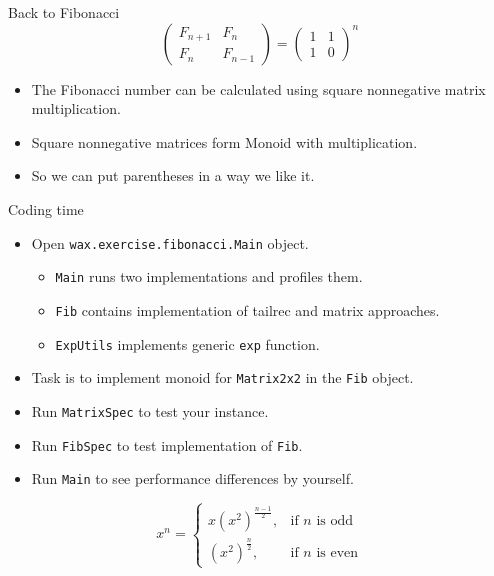 \documentclass[presentation,aspectratio=169,smaller]{beamer}
\begin{document}
\begin{frame}[label={sec:org6fd0c10}]{Back to Fibonacci}
\begin{equation*}
  \begin{pmatrix}
    F_{n+1} & F_n \\
    F_n & F_{n-1}
  \end{pmatrix} =
  \begin{pmatrix}
    1 & 1 \\
    1 & 0
  \end{pmatrix} ^ n
\end{equation*}

\pause

\begin{itemize}
\item The Fibonacci number can be calculated using square nonnegative matrix
multiplication.
\item Square nonnegative matrices form Monoid with multiplication.
\item So we can put parentheses in a way we like it.
\end{itemize}
\end{frame}

\begin{frame}[label={sec:org7776502},fragile]{Coding time}
 \begin{itemize}
\item Open \texttt{wax.exercise.fibonacci.Main} object.
\begin{itemize}
\item \texttt{Main} runs two implementations and profiles them.
\item \texttt{Fib} contains implementation of tailrec and matrix approaches.
\item \texttt{ExpUtils} implements generic \texttt{exp} function.
\end{itemize}
\item Task is to implement monoid for \texttt{Matrix2x2} in the \texttt{Fib} object.
\item Run \texttt{MatrixSpec} to test your instance.
\item Run \texttt{FibSpec} to test implementation of \texttt{Fib}.
\item Run \texttt{Main} to see performance differences by yourself.
\end{itemize}

\pause

\begin{equation*}
  x^n = \begin{cases} x(x^2)^{\frac{n-1}{2}}, & \mbox{if } n\mbox{ is odd} \\ (x^2)^{\frac{n}{2}}, & \mbox{if } n\mbox{ is even} \end{cases}
\end{equation*}
\end{frame}
\end{document}
